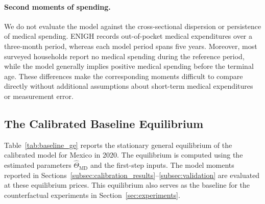 \documentclass[12pt,a4paper]{article}
\begin{document}
\paragraph{Second moments of spending.}
We do not evaluate the model against the cross-sectional dispersion or persistence of medical spending. ENIGH records out-of-pocket medical expenditures over a three-month period, whereas each model period spans five years. Moreover, most surveyed households report no medical spending during the reference period, while the model generally implies positive medical spending before the terminal age. These differences make the corresponding moments difficult to compare directly without additional assumptions about short-term medical expenditures or measurement error.


\subsection{The Calibrated Baseline Equilibrium}
\label{subsec:calibrated_baseline}

Table~\ref{tab:baseline_ge} reports the stationary general equilibrium of the calibrated model for Mexico in 2020. The equilibrium is computed using the estimated parameters $\widehat\Theta_{\mathrm{MD}}$ and the first-step inputs. The model moments reported in Sections~\ref{subsec:calibration_results}--\ref{subsec:validation} are evaluated at these equilibrium prices. This equilibrium also serves as the baseline for the counterfactual experiments in Section~\ref{sec:experiments}.
\end{document}
